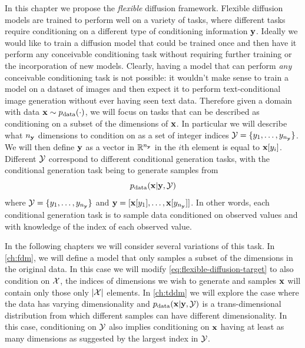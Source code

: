 In this chapter we propose the \textit{flexible} diffusion framework. Flexible diffusion models are trained to perform well on a variety of tasks, where different tasks require conditioning on a different type of conditioning information ${\mathbf{y}}$. Ideally we would like to train a diffusion model that could be trained once and then have it perform any conceivable conditioning task without requiring further training or the incorporation of new models. Clearly, having a model that can perform \textit{any} conceivable conditioning task is not possible: it wouldn't make sense to train a model on a dataset of images and then expect it to perform text-conditional image generation without ever having seen text data. Therefore given a domain with data ${\mathbf{x}} \sim p_{\rm{data}}(\cdot)$, we will focus on tasks that can be described as conditioning on a subset of the dimensions of ${\mathbf{x}}$. In particular we will describe what $n_{\mathbf{y}}$ dimensions to condition on as a set of integer indices ${\mathcal{Y}} = \{ y_1, \ldots, y_{n_{\mathbf{y}}} \}$. We will then define ${\mathbf{y}}$ as a vector in $\mathbb{R}^{n_{\mathbf{y}}}$ in the $i$th element is equal to ${\mathbf{x}}[y_i]$. Different ${\mathcal{Y}}$ correspond to different conditional generation tasks, with the conditional generation task being to generate samples from
\begin{equation} \label{eq:flexible-diffusion-target}
    p_{\rm{data}}({\mathbf{x}} | {\mathbf{y}}, {\mathcal{Y}})
\end{equation}
where ${\mathcal{Y}} = \{ y_1, \ldots, y_{n_{\mathbf{y}}} \}$ and ${\mathbf{y}} = [ {\mathbf{x}}[y_1], \ldots, {\mathbf{x}}[y_{n_{\mathbf{y}}}] ]$. In other words, each conditional generation task is to sample data conditioned on observed values and with knowledge of the index of each observed value.

In the following chapters we will consider several variations of this task. In \cref{ch:fdm}, we will define a model that only samples a subset of the dimensions in the original data. In this case we will modify \cref{eq:flexible-diffusion-target} to also condition on ${\mathcal{X}}$, the indices of dimensions we wish to generate and samples ${\mathbf{x}}$ will contain only those only $|{\mathcal{X}}|$ elements. In \cref{ch:tddm} we will explore the case where the data has varying dimensionality and $p_{\rm{data}}({\mathbf{x}} | {\mathbf{y}}, {\mathcal{Y}})$ is a trans-dimensional distribution from which different samples can have different dimensionality. In this case, conditioning on ${\mathcal{Y}}$ also implies conditioning on ${\mathbf{x}}$ having at least as many dimensions as suggested by the largest index in ${\mathcal{Y}}$.


